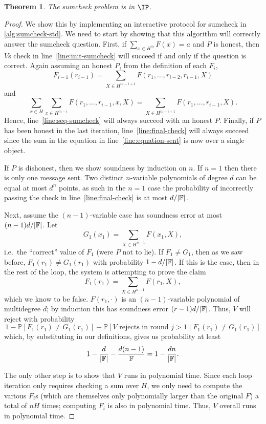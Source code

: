 \documentclass[english]{reedthesis}
\theoremstyle{plain}
\newtheorem{thm}{Theorem}[section]
\theoremstyle{definition}
\theoremstyle{remark}
\DeclarePairedDelimiter{\abs}{\lvert}{\rvert}
\begin{document}
\begin{thm}\label{thm:sumcheck-ip}
  The sumcheck problem is in $\IP$.
\end{thm}

\begin{proof}
  We show this by implementing an interactive protocol for sumcheck in
  \cref{alg:sumcheck-std}. We need to start by showing that this algorithm will
  correctly answer the sumcheck question. First, if $\sum_{x \in H^{m}}F(x) = a$ and
  $P$ is honest, then $V$s check in line~\ref{line:init-sumcheck} will succeed
  if and only if the question is correct. Again assuming an honest $P$, from the
  definition of each $F_{i}$,
  \[
    F_{i-1}(r_{i-1}) = \sum_{X \in H^{m-i+1}}F(r_{1}, \ldots, r_{i-2}, r_{i-1}, X)
  \]
  and
  \[
    \sum_{x \in H}\sum_{x \in H^{m-i}}F(r_{1}, \ldots, r_{i-1}, x, X) = \sum_{X \in H^{m-i+1}}F(r_{1}, \ldots, r_{i-1}, X).
  \]
  Hence, line~\ref{line:seq-sumcheck} will always succeed with an honest $P$.
  Finally, if $P$ has been honest in the last iteration,
  line~\ref{line:final-check} will always succeed since the sum in the equation
  in line~\ref{line:equation-sent} is now over a single object.

  If $P$ is dishonest, then we show soundness by induction on $n$. If $n = 1$
  then there is only one message sent. Two distinct $n$-variable polynomials of
  degree $d$ can be equal at most $d^{n}$ points, as such in the $n = 1$ case
  the probability of incorrectly passing the check in
  line~\ref{line:final-check} is at most $d/\abs{\mathbb{F}}$.

  Next, assume the $(n - 1)$-variable case has soundness error at most
  $(n - 1)d/\abs{\mathbb{F}}$. Let
  \[
    G_{1}(x_{1}) = \sum_{X \in H^{n-1}}F(x_{1}, X),
  \]
  i.e.\ the ``correct'' value of $F_{1}$ (were $P$ not to lie). If
  $F_{1} \ne G_{1}$, then as we saw before, $F_{1}(r_{1}) \ne G_{1}(r_{1})$ with
  probability $1 - d/\abs{\mathbb{F}}$. If this is the case, then in the rest of
  the loop, the system is attempting to prove the claim
  \[
    F_{1}(r_{1}) = \sum_{X \in H^{n-1}}F(r_{1}, X),
  \]
  which we know to be false. $F(r_{1}, \cdot)$ is an $(n - 1)$-variable polynomial
  of multidegree $d$; by induction this has soundness error
  $(r - 1)d/\abs{\mathbb{F}}$. Thus, $V$ will reject with probability
  \[
    1 - \mathbb{P}[F_{1}(r_{1}) \ne G_{1}(r_{1})] - \mathbb{P}[V \text{ rejects in round } j > 1 \mid F_{1}(r_{1}) \ne G_{1}(r_{1})]
  \]
  which, by substituting in our definitions, gives us probability at least
  \[
    1 - \frac{d}{\abs{\mathbb{F}}} - \frac{d(n - 1)}{\mathbb{F}} = 1 - \frac{dn}{\abs{\mathbb{F}}}.
  \]

  The only other step is to show that $V$ runs in polynomial time. Since each
  loop iteration only requires checking a sum over $H$, we only need to compute
  the various $F_{i}$s (which are themselves only polynomially larger than the
  original $F$) a total of $nH$ times; computing $F_{i}$ is also in polynomial
  time. Thus, $V$ overall runs in polynomial time.
\end{proof}
\end{document}
